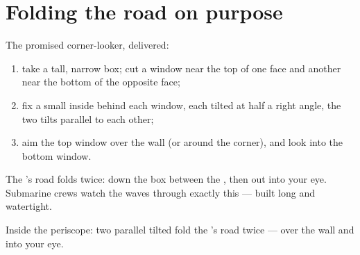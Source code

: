 \section{Folding the road on purpose}

\begin{method}\label{met:g5:mirrors-reflection:periscope}
The promised corner-looker, delivered:
\begin{enumerate}
  \item take a tall, narrow box; cut a window near the top of one
        face and another near the bottom of the opposite face;
  \item fix a small  inside behind each window, each tilted
        at half a right angle, the two tilts parallel to each
        other;
  \item aim the top window over the wall (or around the corner),
        and look into the bottom window.
\end{enumerate}
The 's road folds twice: down the box between the ,
then out into your eye. Submarine crews watch the waves through
exactly this --- built long and watertight.
\end{method}

\begin{omfigure}

{\small Inside the periscope: two parallel tilted  fold the
's road twice --- over the wall and into your eye.}
\end{omfigure}

